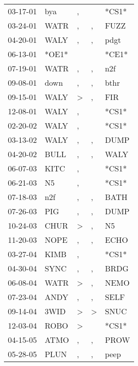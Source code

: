 \begin{supertabular}{lllll}
 03-17-01 &    bya &             , &               &  *CS1* \\
 03-24-01 &   WATR &             , &             , &   FUZZ \\
 04-20-01 &   WALY &             , &             , &   pdgt \\
 06-13-01 &  *OE1* &               &               &  *CE1* \\
 07-19-01 &   WATR &             , &             , &    n2f \\
 09-08-01 &   down &             , &             , &   bthr \\
 09-15-01 &   WALY &  \textgreater &             , &    FIR \\
 12-08-01 &   WALY &             , &               &  *CS1* \\
 02-20-02 &   WALY &             , &               &  *CS1* \\
 03-13-02 &   WALY &             , &             , &   DUMP \\
 04-20-02 &   BULL &             , &             , &   WALY \\
 06-07-03 &   KITC &             , &               &  *CS1* \\
 06-21-03 &     N5 &             , &               &  *CS1* \\
 07-18-03 &    n2f &             , &             , &   BATH \\
 07-26-03 &    PIG &             , &             , &   DUMP \\
 10-24-03 &   CHUR &  \textgreater &             , &     N5 \\
 11-20-03 &   NOPE &             , &             , &   ECHO \\
 03-27-04 &   KIMB &             , &               &  *CS1* \\
 04-30-04 &   SYNC &             , &             , &   BRDG \\
 06-08-04 &   WATR &  \textgreater &             , &   NEMO \\
 07-23-04 &   ANDY &             , &             , &   SELF \\
 09-14-04 &   3WID &  \textgreater &  \textgreater &   SNUC \\
 12-03-04 &   ROBO &  \textgreater &               &  *CS1* \\
 04-15-05 &   ATMO &             , &             , &   PROW \\
 05-28-05 &   PLUN &             , &             , &   peep \\

\end{supertabular}
